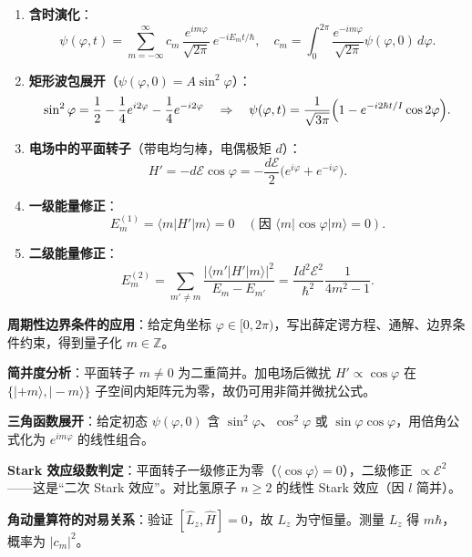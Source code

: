 \begin{formulabox}[核心公式]
\begin{enumerate}[label=\textbf{(\arabic*)}]
    \item \textbf{含时演化}：
    \[
    \psi(\varphi,t)=\sum_{m=-\infty}^{\infty}c_m\,\frac{e^{im\varphi}}{\sqrt{2\pi}}\,e^{-iE_mt/\hbar},
    \quad c_m=\int_0^{2\pi}\frac{e^{-im\varphi}}{\sqrt{2\pi}}\psi(\varphi,0)\,d\varphi.
    \]

    \item \textbf{矩形波包展开}（$\psi(\varphi,0)=A\sin^2\varphi$）：
    \[
    \sin^2\varphi=\frac12-\frac14e^{i2\varphi}-\frac14e^{-i2\varphi}
    \quad\Rightarrow\quad
    \psi(\varphi,t)=\frac{1}{\sqrt{3\pi}}\Bigl(1-e^{-i2\hbar t/I}\cos2\varphi\Bigr).
    \]

    \item \textbf{电场中的平面转子}（带电均匀棒，电偶极矩 $d$）：
    \[
    H'=-d\mathcal{E}\cos\varphi=-\frac{d\mathcal{E}}{2}\bigl(e^{i\varphi}+e^{-i\varphi}\bigr).
    \]

    \item \textbf{一级能量修正}：
    \[
    E_m^{(1)}=\langle m|H'|m\rangle=0\quad(\text{因 }\langle m|\cos\varphi|m\rangle=0).
    \]

    \item \textbf{二级能量修正}：
    \[
    E_m^{(2)}=\sum_{m'\neq m}\frac{|\langle m'|H'|m\rangle|^2}{E_m-E_{m'}}
    =\frac{Id^2\mathcal{E}^2}{\hbar^2}\frac{1}{4m^2-1}.
    \]
\end{enumerate}
\end{formulabox}

\begin{drillbox}[训练点与考法变体]
 \textbf{周期性边界条件的应用}：给定角坐标 $\varphi\in[0,2\pi)$，写出薛定谔方程、通解、边界条件约束，得到量子化 $m\in\mathbb{Z}$。

 \textbf{简并度分析}：平面转子 $m\neq0$ 为二重简并。加电场后微扰 $H'\propto\cos\varphi$ 在 $\{|+m\rangle,|-m\rangle\}$ 子空间内矩阵元为零，故仍可用非简并微扰公式。

 \textbf{三角函数展开}：给定初态 $\psi(\varphi,0)$ 含 $\sin^2\varphi$、$\cos^2\varphi$ 或 $\sin\varphi\cos\varphi$，用倍角公式化为 $e^{im\varphi}$ 的线性组合。

 \textbf{Stark 效应级数判定}：平面转子一级修正为零（$\langle\cos\varphi\rangle=0$），二级修正 $\propto\mathcal{E}^2$——这是``二次 Stark 效应''。对比氢原子 $n\geq2$ 的线性 Stark 效应（因 $l$ 简并）。

 \textbf{角动量算符的对易关系}：验证 $[\hat L_z,\hat H]=0$，故 $L_z$ 为守恒量。测量 $L_z$ 得 $m\hbar$，概率为 $|c_m|^2$。
\end{drillbox}

